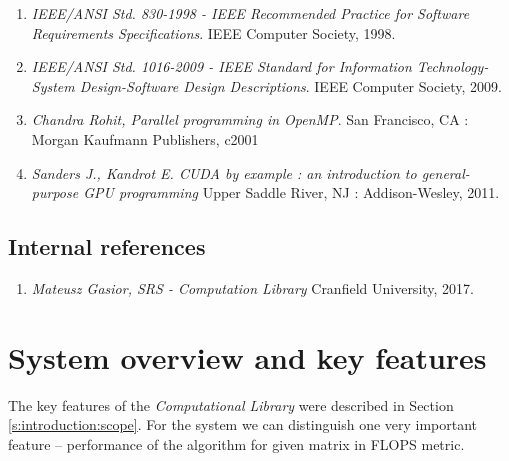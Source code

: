 	\begin{enumerate}
		\item \emph{IEEE/ANSI Std. 830-1998 - IEEE Recommended Practice for Software Requirements Specifications}. IEEE Computer Society, 1998.
		\item \emph{IEEE/ANSI Std. 1016-2009 - IEEE Standard for Information Technology-System Design-Software Design Descriptions}. IEEE Computer Society, 2009.
		\item \emph{Chandra Rohit, Parallel programming in OpenMP}. San Francisco, CA : Morgan Kaufmann Publishers, c2001
		\item \emph{Sanders J., Kandrot E. CUDA by example : an introduction to general-purpose GPU programming} Upper Saddle River, NJ : Addison-Wesley, 2011.
	\end{enumerate}
	
\subsection*{Internal references} \label{s:introduction:internal-references}
	\begin{comment}
		$<$ List references to documents such as other plans or task descriptions that supplement this plan, e.g.:
		\begin{enumerate}
		\item Project authorization
		\item Project plan (or project management plan)
		\item Quality assurance plan
		\item Configuration management plan
		\end{enumerate}
		$>$
	\end{comment}

	\begin{enumerate}
		\item \emph{Mateusz Gasior, SRS - Computation Library} Cranfield University, 2017.
	\end{enumerate}
	
\section{System overview and key features} \label{s:introduction:system-overview-and-key-features}
	\begin{comment}
		$<$Describe the mission or business purpose of the system or software product under test (or reference where the information can be found, e.g., in a system definition document, such as a Concept of
		Operations). Describe the key features of the system or software under test [or reference where the information can be found, e.g., in a requirements document or COTS documentation]. $>$
	\end{comment}
	The key features of the \emph{Computational Library} were described in Section \ref{s:introduction:scope}. For the system we can distinguish one very important feature -- performance of the algorithm for given matrix in \gls{FLOPS} metric. 
